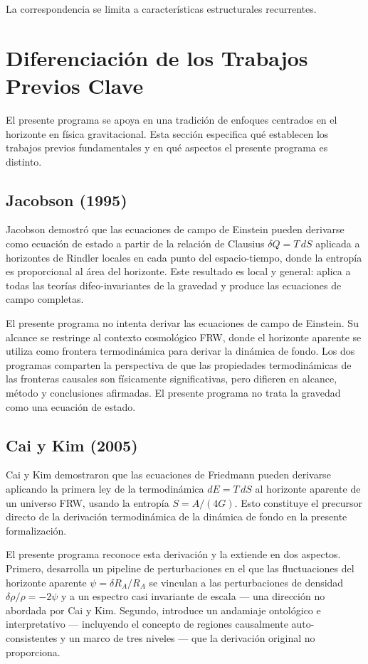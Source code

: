 \documentclass[12pt,a4paper]{article}
\begin{document}
La correspondencia se limita a características estructurales recurrentes.

\section{Diferenciación de los Trabajos Previos Clave}

El presente programa se apoya en una tradición de enfoques centrados en el horizonte en física gravitacional. Esta sección especifica qué establecen los trabajos previos fundamentales y en qué aspectos el presente programa es distinto.

\subsection*{Jacobson (1995)}

Jacobson demostró que las ecuaciones de campo de Einstein pueden derivarse como ecuación de estado a partir de la relación de Clausius $\delta Q = T\,dS$ aplicada a horizontes de Rindler locales en cada punto del espacio-tiempo, donde la entropía es proporcional al área del horizonte. Este resultado es local y general: aplica a todas las teorías difeo-invariantes de la gravedad y produce las ecuaciones de campo completas.

El presente programa no intenta derivar las ecuaciones de campo de Einstein. Su alcance se restringe al contexto cosmológico FRW, donde el horizonte aparente se utiliza como frontera termodinámica para derivar la dinámica de fondo. Los dos programas comparten la perspectiva de que las propiedades termodinámicas de las fronteras causales son físicamente significativas, pero difieren en alcance, método y conclusiones afirmadas. El presente programa no trata la gravedad como una ecuación de estado.

\subsection*{Cai y Kim (2005)}

Cai y Kim demostraron que las ecuaciones de Friedmann pueden derivarse aplicando la primera ley de la termodinámica $dE = T\,dS$ al horizonte aparente de un universo FRW, usando la entropía $S = A/(4G)$. Esto constituye el precursor directo de la derivación termodinámica de la dinámica de fondo en la presente formalización.

El presente programa reconoce esta derivación y la extiende en dos aspectos. Primero, desarrolla un pipeline de perturbaciones en el que las fluctuaciones del horizonte aparente $\psi = \delta R_A / R_A$ se vinculan a las perturbaciones de densidad $\delta\rho/\rho = -2\psi$ y a un espectro casi invariante de escala --- una dirección no abordada por Cai y Kim. Segundo, introduce un andamiaje ontológico e interpretativo --- incluyendo el concepto de regiones causalmente auto-consistentes y un marco de tres niveles --- que la derivación original no proporciona.
\end{document}

